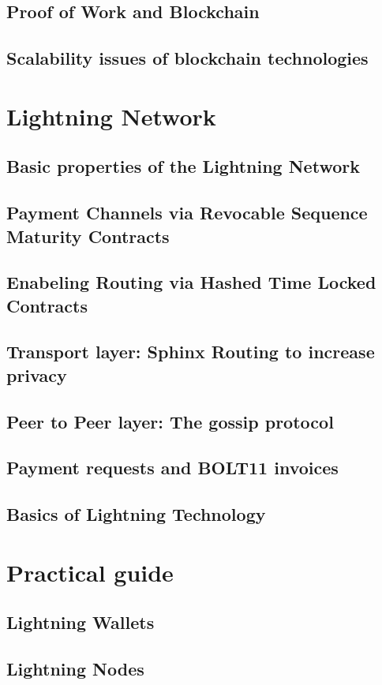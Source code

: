 \documentclass[ebook,12pt,oneside,openany]{memoir}
\begin{document}
\section{Proof of Work and Blockchain}

\section{Scalability issues of blockchain technologies}
\chapter{Lightning Network}
\section{Basic properties of the Lightning Network}
\section{Payment Channels via Revocable Sequence Maturity Contracts}
\section{Enabeling Routing via Hashed Time Locked Contracts}
\section{Transport layer: Sphinx Routing to increase privacy}
\section{Peer to Peer layer: The gossip protocol}
\section{Payment requests and BOLT11 invoices}
\section{Basics of Lightning Technology}
\chapter{Practical guide}
\section{Lightning Wallets}
\section{Lightning Nodes}
\end{document}
